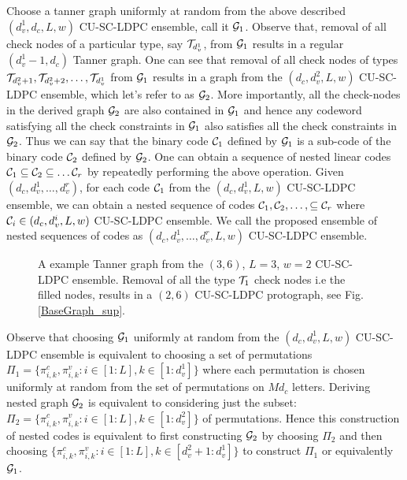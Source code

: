 Choose a tanner graph uniformly at random from the above described $(d_{v}^{1},d_{c},L,w)$ CU-SC-LDPC ensemble, call it $\mathcal{G}_{1}$. Observe that, removal of all check nodes of a particular type, say $\mathcal{T}_{d_{v}^{1}}$, from $\mathcal{G}_{1}$ results in a regular $(d_{v}^{1}-1,d_{c})$ Tanner graph. One can see that removal of all check nodes of types $\mathcal{T}_{d_{v}^{2}+1},\mathcal{T}_{d_{v}^{2}+2},\ldots, \mathcal{T}_{d_{v}^1} $ from $\mathcal{G}_{1}$ results in a graph from the $(d_{c},d_{v}^{2},L,w)$ CU-SC-LDPC ensemble, which let's refer to as $\mathcal{G}_{2}$. More importantly, all the check-nodes in the derived graph $\mathcal{G}_{2}$ are also contained in $\mathcal{G}_{1}$ and hence any codeword satisfying all the check constraints in $\mathcal{G}_{1}$ also satisfies all the check constraints in $\mathcal{G}_{2}$. Thus we can say that the binary code $\mathcal{C}_{1}$ defined by $\mathcal{G}_{1}$ is a sub-code of the binary code $\mathcal{C}_{2}$ defined by $\mathcal{G}_{2}$. One can obtain a sequence of nested linear codes $\mathcal{C}_1\subseteq\mathcal{C}_2\subseteq\ldots\mathcal{C}_r$ by repeatedly performing the above operation. Given $(d_{c},d_{v}^{1},\ldots,d_{v}^{r})$, for each code $\mathcal{C}_{1}$ from the $(d_{c},d_{v}^{1},L,w)$ CU-SC-LDPC ensemble, we can obtain a nested sequence of codes $\mathcal{C}_1,\mathcal{C}_2,\ldots,\subseteq\mathcal{C}_r$ where $\mathcal{C}_{i} \in (d_{c},d_{v}^{i},L,w)$ CU-SC-LDPC ensemble.  We call the proposed ensemble of nested sequences of codes as $(d_{c},d_{v}^{1},\ldots,d_{v}^{r},L,w)$ CU-SC-LDPC ensemble. 

\begin{figure}[ht!]
\centering
{} {

}
\caption{A example Tanner graph from the $(3,6)$, $L=3$, $w=2$ CU-SC-LDPC ensemble. Removal of all the type $\mathcal{T}_{1}$ check nodes i.e the filled nodes, results in a $(2,6)$ CU-SC-LDPC protograph, see Fig.\ref{BaseGraph_sup}. }
\label{Basegraph}
\end{figure}


\begin{remark}\label{Rmk:EquivNestedConstr1}
Observe that choosing $\mathcal{G}_{1}$ uniformly at random from the $(d_{c},d_{v}^{1},L,w)$ CU-SC-LDPC ensemble is equivalent to choosing a set of permutations $\Pi_{1}=\{\pi_{i,k}^{c},\pi_{i,k}^{v}: i\in[1:L],k\in[1:d_{v}^{1}]\}$ where each permutation is chosen uniformly at random from the set of permutations on $Md_{c}$ letters. Deriving nested graph $\mathcal{G}_{2}$ is equivalent to considering just the subset: $\Pi_{2}=\{\pi_{i,k}^{c},\pi_{i,k}^{v}: i\in[1:L],k\in[1:d_{v}^{2}]\}$ of permutations. Hence this construction of nested codes is equivalent to first constructing $\mathcal{G}_{2}$ by choosing $\Pi_{2}$ and then choosing $\{\pi_{i,k}^{c},\pi_{i,k}^{v}: i\in[1:L], k\in[d_{v}^{2}+1:d_{v}^{1}]\}$ to construct $\Pi_{1}$ or equivalently $\mathcal{G}_{1}$.
\end{remark}


